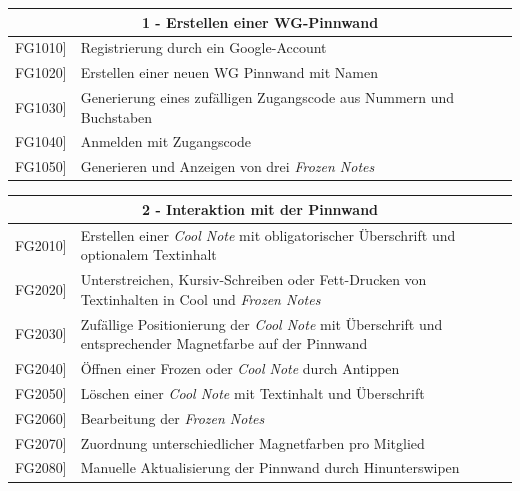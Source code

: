 \documentclass[a4paper]{scrreprt}
\begin{document}
    		\begin{table}[h!]
    			\centering
    			\label{my-label}
    			\begin{tabular}{p{2cm}p{12cm}}
    				
    				\multicolumn{2}{c}{\textbf{1 - Erstellen einer WG-Pinnwand}} \\ \hline
    				\centering{[}FG1010{]} & Registrierung durch ein Google-Account\\
    				\centering{[}FG1020{]}& Erstellen einer neuen WG Pinnwand mit Namen                                 \\
    				\centering{[}FG1030{]}& Generierung eines zufälligen Zugangscode aus Nummern und Buchstaben\\ 
    				\centering{[}FG1040{]}& Anmelden mit Zugangscode\\ 
    				\centering{[}FG1050{]}& Generieren und Anzeigen von drei \textit{Frozen Notes}\\ 
    				\hline
    			\end{tabular}
    		\end{table}
    		
    		\vspace{5mm}
    		
    		\begin{table}[h!]
    			\centering
    			\label{my-label}
    			\begin{tabular}{p{2cm}p{12cm}}
    				
    				\multicolumn{2}{c}{\textbf{2 - Interaktion mit der Pinnwand}} \\ \hline
    				\centering{[}FG2010{]} & Erstellen einer \textit{Cool Note} mit obligatorischer Überschrift und optionalem Textinhalt\\
    				\centering{[}FG2020{]}& Unterstreichen, Kursiv-Schreiben oder Fett-Drucken von Textinhalten in Cool und \textit{Frozen Notes}                               \\
    				\centering{[}FG2030{]}& Zufällige Positionierung der \textit{Cool Note} mit Überschrift und entsprechender Magnetfarbe auf der Pinnwand\\ 
    				\centering{[}FG2040{]}& Öffnen einer Frozen oder \textit{Cool Note} durch Antippen\\ 
    				\centering{[}FG2050{]}& Löschen einer \textit{Cool Note} mit Textinhalt und Überschrift\\ 
    				\centering{[}FG2060{]}& Bearbeitung der \textit{Frozen Notes}\\ 
    				\centering{[}FG2070{]}& Zuordnung unterschiedlicher Magnetfarben pro Mitglied\\ 
    				\centering{[}FG2080{]}& Manuelle Aktualisierung der Pinnwand durch Hinunterswipen\\ 
    				\hline
    			\end{tabular}
    		\end{table}
    		
\end{document}
